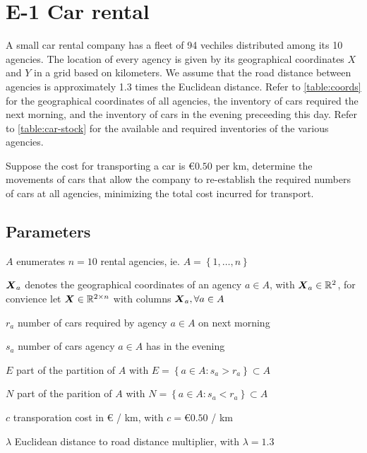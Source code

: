 \chapter{E-1 Car rental}

A small car rental company has a fleet of 94 vechiles distributed among its
10 agencies. The location of every agency is given by its geographical coordinates
$X$ and $Y$ in a grid based on kilometers. We assume that the road distance
between agencies is approximately 1.3 times the Euclidean distance. Refer to
\cref{table:coords} for the geographical coordinates of all agencies, the inventory
of cars required the next morning, and the inventory of cars in the evening
preceeding this day. Refer to \cref{table:car-stock} for the available and required
inventories of the various agencies.

Suppose the cost for transporting a car is $\euro{}0.50$ per km, determine the
movements of cars that allow the company to re-establish the required numbers of
cars at all agencies, minimizing the total cost incurred for transport.

\section{Parameters}

\begin{syms}

\item[$A$] enumerates $n=10$ rental agencies, ie. $A=\left\lbrace 1,\ldots, n\right\rbrace$

\item[$\boldsymbol{X}_a$] denotes the geographical coordinates of an agency $a\in A$, with
    $\boldsymbol{X}_a \in \mathbb{R}^2$, for convience let $\boldsymbol{X} \in \mathbb{R}^{2\times n}$ with
    columns $\boldsymbol{X}_a, \forall a\in A$

\item[$r_a$] number of cars required by agency $a\in A$ on next morning

\item[$s_a$] number of cars agency $a\in A$ has in the evening

\item[$E$] part of the partition of $A$ with 
    $E= \left\lbrace a\in A : s_a > r_a \right\rbrace \subset A$

\item[$N$] part of the parition of $A$ with
    $N = \left\lbrace a\in A: s_a < r_a \right\rbrace \subset A$

\item[$c$] transporation cost in \euro{} / km, with $c=\euro{}0.50$ / km

\item[$\lambda$] Euclidean distance to road distance multiplier, with $\lambda=1.3$

\end{syms}

